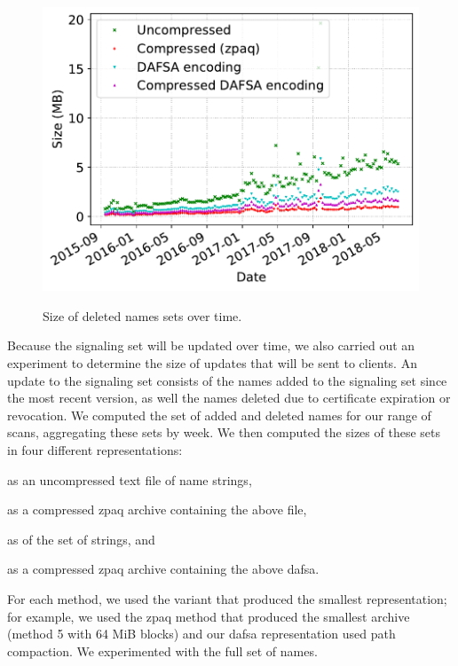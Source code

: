 \begin{figure}[t]
  \centering
  \includegraphics[width=\linewidth]{fig/deleted_name_set_size}
  \label{fig:updates:deleted}
  \caption{Size of deleted names sets over time.}
  \label{fig:updates}
\end{figure}

Because the signaling set will be updated over time, we also carried out an
experiment to determine the size of updates that will be sent to clients. 
An update to the signaling set consists of the names added to the signaling
set since the most recent version, as well the names 
deleted due to certificate expiration or revocation. We computed the set of
added and deleted names for our range of scans, aggregating these sets by week.
We then computed the sizes of these sets in four different representations:
\begin{inparaenum}[(1)]
\item as an uncompressed text file of name strings,
\item as a compressed zpaq archive containing the above file,
\item as  of the set of strings, and
\item as a compressed zpaq archive containing the above \ac{dafsa}.
\end{inparaenum}
For each method, we used the variant that produced the smallest representation;
for example, we used the zpaq method that produced the smallest archive (method
5 with 64 MiB blocks) and our \ac{dafsa} representation used path compaction.
We experimented with the full set of names.

